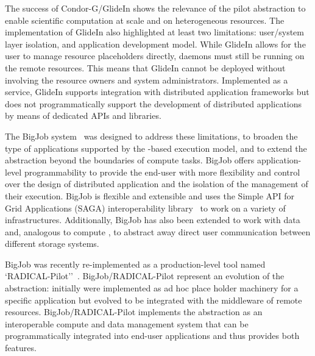 \documentclass{sig-alternate}
\begin{document}
The success of Condor-G/GlideIn shows the relevance of the pilot abstraction to
enable scientific computation at scale and on heterogeneous resources. The
implementation of GlideIn also highlighted at least two limitations: user/system
layer isolation, and application development model. While GlideIn allows for the
user to manage resource placeholders directly, daemons must still be running on
the remote resources. This means that GlideIn cannot be deployed without
involving the resource owners and system administrators. Implemented as a
service, GlideIn supports integration with distributed application frameworks
but does not programmatically support the development of distributed
applications by means of dedicated APIs and libraries.

The BigJob \pilotjob system~\cite{luckow2010} was designed to address these
limitations, to broaden the type of applications supported by the \pilot-based
execution model, and to extend the \pilot abstraction beyond the boundaries of
compute tasks.  BigJob offers application-level programmability to provide the
end-user with more flexibility and control over the design of distributed
application and the isolation of the management of their execution. BigJob is
flexible and extensible and uses the Simple API for Grid Applications (SAGA)
interoperability library~\cite{saga-x,goodale2006,luckow2010} to work on a
variety of infrastructures.  Additionally, BigJob has also been extended to work
with data and, analogous to compute \pilots, to abstract away direct user
communication between different storage systems.



BigJob was recently re-implemented as a production-level tool named
`RADICAL-Pilot''~\cite{review_rp-paper-2015}. BigJob/RADICAL-Pilot represent an
evolution of the \pilot abstraction: initially \pilot were implemented as ad hoc
place holder machinery for a specific application but evolved to be integrated
with the middleware of remote resources. BigJob/RADICAL-Pilot implements the
\pilot abstraction as an interoperable compute and data management system that
can be programmatically integrated into end-user applications and thus provides
both features.
\end{document}
